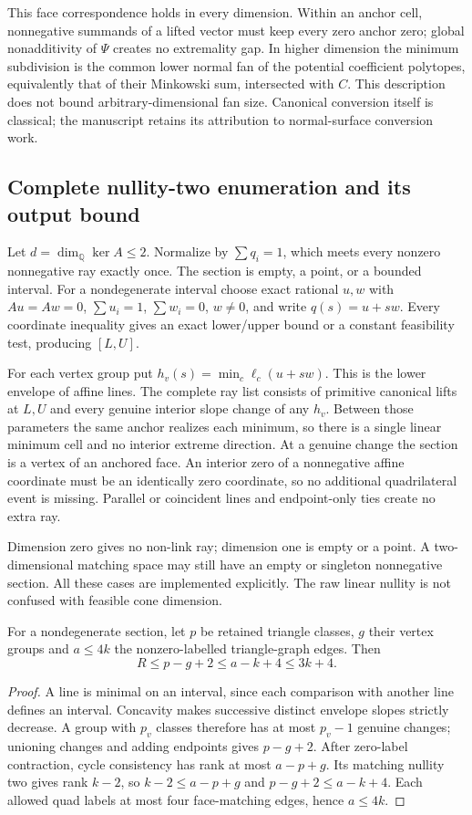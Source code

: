 This face correspondence holds in every dimension. Within an anchor cell,
nonnegative summands of a lifted vector must keep every zero anchor zero;
global nonadditivity of $\Psi$ creates no extremality gap. In higher dimension
the minimum subdivision is the common lower normal fan of the potential
coefficient polytopes, equivalently that of their Minkowski sum, intersected
with $C$. This description does not bound arbitrary-dimensional fan size.
Canonical conversion itself is classical; the manuscript retains its
attribution to normal-surface conversion work.

\subsection{Complete nullity-two enumeration and its output bound}

Let $d=\dim_{\mathbb Q}\ker A\le2$. Normalize by $\sum q_i=1$, which meets
every nonzero nonnegative ray exactly once. The section is empty, a point,
or a bounded interval. For a nondegenerate interval choose exact rational
$u,w$ with $Au=Aw=0$, $\sum u_i=1$, $\sum w_i=0$, $w\ne0$, and write
$q(s)=u+sw$. Every coordinate inequality gives an exact lower/upper bound
or a constant feasibility test, producing $[L,U]$.

For each vertex group put $h_v(s)=\min_c\ell_c(u+sw)$. This is the lower
envelope of affine lines. The complete ray list consists of primitive
canonical lifts at $L,U$ and every genuine interior slope change of any
$h_v$. Between those parameters the same anchor realizes each minimum,
so there is a single linear minimum cell and no interior extreme direction.
At a genuine change the section is a vertex of an anchored face. An interior
zero of a nonnegative affine coordinate must be an identically zero
coordinate, so no additional quadrilateral event is missing. Parallel or
coincident lines and endpoint-only ties create no extra ray.

Dimension zero gives no non-link ray; dimension one is empty or a point.
A two-dimensional matching space may still have an empty or singleton
nonnegative section. All these cases are implemented explicitly. The raw
linear nullity is not confused with feasible cone dimension.

\begin{proposition}
For a nondegenerate section, let $p$ be retained triangle classes, $g$ their
vertex groups and $a\le4k$ the nonzero-labelled triangle-graph edges. Then
\[
 R\le p-g+2\le a-k+4\le3k+4.
\]
\end{proposition}
\begin{proof}
A line is minimal on an interval, since each comparison with another line
defines an interval. Concavity makes successive distinct envelope slopes
strictly decrease. A group with $p_v$ classes therefore has at most $p_v-1$
genuine changes; unioning changes and adding endpoints gives $p-g+2$.
After zero-label contraction, cycle consistency has rank at most
$a-p+g$. Its matching nullity two gives rank $k-2$, so
$k-2\le a-p+g$ and $p-g+2\le a-k+4$. Each allowed quad labels at most
four face-matching edges, hence $a\le4k$.
\end{proof}


